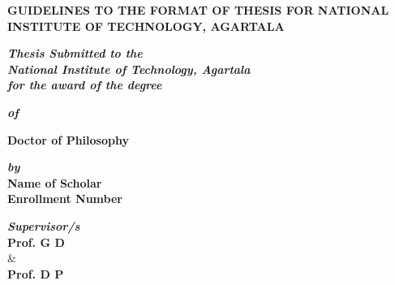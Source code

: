 \begin{center}
{\Large \bf  GUIDELINES TO THE FORMAT OF THESIS FOR NATIONAL INSTITUTE OF TECHNOLOGY, AGARTALA} 
\end{center}
\vspace{2pt}
\normalsize
\begin{center}
{\bf \em Thesis Submitted to the}  \\
{\bf \em National Institute of Technology, Agartala} \\
{\bf \em for the award of the degree} \\ 
\end{center}

\onehalfspacing
\vspace{-5.0 pt}
\normalsize
\begin{center}
{\bf \em of} \\ 
\end{center}
\vspace{-5.0pt}
\Large
\begin{center}
{\textbf{Doctor of Philosophy}}\\
\end{center}
\vspace{-1pt}
\normalsize
\begin{center}
{\bf \em by}\\
\vspace{-2 pt}
\Large
{\textbf{Name of Scholar}} \\ 
\vspace{2 pt}
{\textbf{Enrollment Number}} \\ 
\end{center}
\vspace{2 pt}
\begin{center}
{\bf \em Supervisor/s}  \\
\vspace{2 pt}
\textbf{Prof. G D}\\
\& \\
\textbf{Prof. D P}\\
\end{center}

